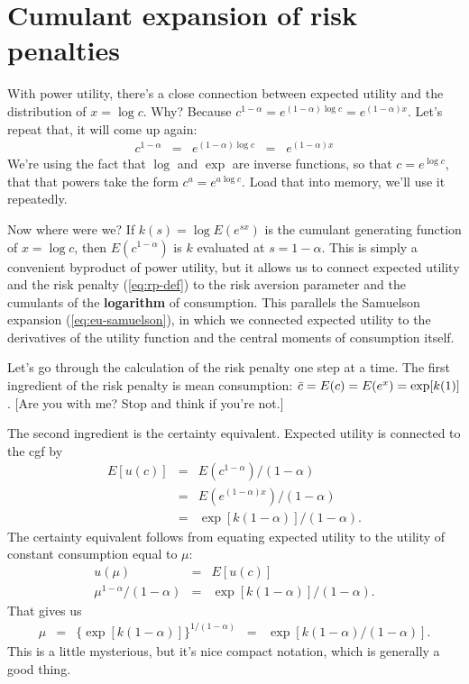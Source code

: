 \documentclass[11pt]{article}
\begin{document}
\section{Cumulant expansion of risk penalties}

With power utility, there's a close connection between expected
utility and the distribution of $ x = \log c$.
Why?
Because $c^{1-\alpha} = e^{(1-\alpha) \log c} = e^{(1-\alpha) x }$.
Let's repeat that, it will come up again:
\begin{eqnarray*}
    c^{1-\alpha} &=& e^{(1-\alpha) \log c} \;\;=\;\; e^{(1-\alpha) x }
\end{eqnarray*}
We're using the fact that $\log$ and $\exp$ are inverse functions,
so that $ c = e^{\log c} $,
that that powers take the form $c^a = e^{a \log c} $.
Load that into memory, we'll use it repeatedly.

Now where were we?
If $k(s) = \log E (e^{sx})$ is the cumulant generating function of $x = \log c$,
then $E(c^{1-\alpha})$  is $k$ evaluated at $ s = 1-\alpha$.
This is simply a convenient byproduct of  power utility,
but it allows us to connect expected utility and the risk penalty (\ref{eq:rp-def})
to the risk aversion parameter and the cumulants of the {\bf logarithm} of consumption.
This parallels the Samuelson expansion (\ref{eq:eu-samuelson}),
in which we connected expected utility to the derivatives of the utility function
and the central moments of consumption itself.


Let's go through the calculation of the risk penalty one step at a time.
The first ingredient of the risk penalty is mean consumption:
$\bar{c} = E(c) = E (e^x) = \exp[k(1)]$.
[Are you with me?  Stop and think if you're not.]

The second ingredient is the certainty equivalent.
Expected utility is connected to the cgf by
\begin{eqnarray*}
    E[u(c)] &=&   E (c^{1-\alpha})/(1-\alpha) \\
            &=& E (e^{(1-\alpha) x})/(1-\alpha) \\
            &=&  \exp[k(1-\alpha)]/(1-\alpha) .
\end{eqnarray*}
The certainty equivalent follows from equating expected utility to the utility
of constant consumption equal to $\mu$:
\begin{eqnarray*}
    u (\mu) &=& E [u(c)]  \\
    \mu^{1-\alpha}/(1-\alpha)
            &=& \exp[k(1-\alpha)]/(1-\alpha) .
\end{eqnarray*}
That gives us
\begin{eqnarray*}
    \mu &=&  \big\{ \exp[k(1-\alpha)] \big\} ^{1/(1-\alpha)}  \;\;=\;\; \exp[k(1-\alpha)/(1-\alpha)]  .
\end{eqnarray*}
This is a little mysterious, but it's nice compact notation,
which is generally a good thing.
\end{document}
